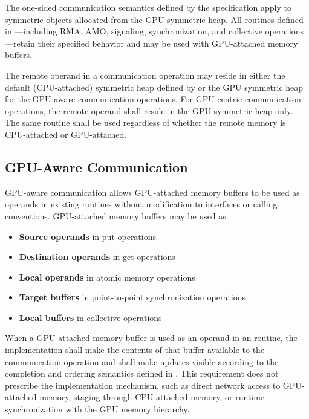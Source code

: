 
The one-sided communication semantics defined by the \openshmem specification
apply to symmetric objects allocated from the \ac{GPU} symmetric heap. All
routines defined in ---including \ac{RMA}, \ac{AMO}, signaling,
synchronization, and collective operations---retain their specified behavior and
may be used with GPU-attached memory buffers.

The remote operand in a communication operation may reside in either the default
(CPU-attached) symmetric heap defined by  or the \ac{GPU}
symmetric heap for the GPU-aware communication operations. For GPU-centric
communication operations, the remote operand shall reside in the \ac{GPU}
symmetric heap only. The same \openshmem routine shall be used regardless of whether
the remote memory is CPU-attached or GPU-attached.

\subsection{GPU-Aware Communication}\label{subsec:gpu_aware_comm}

GPU-aware communication allows GPU-attached memory buffers to be used as
operands in existing \openshmem routines without modification to interfaces or
calling conventions. GPU-attached memory buffers may be used as:

\begin{itemize}
\item \textbf{Source operands} in put operations
\item \textbf{Destination operands} in get operations
\item \textbf{Local operands} in atomic memory operations
\item \textbf{Target buffers} in point-to-point synchronization operations
\item \textbf{Local buffers} in collective operations
\end{itemize}

When a GPU-attached memory buffer is used as an operand in an \openshmem
routine, the \openshmem implementation shall make the contents of that buffer
available to the communication operation and shall make updates visible according
to the completion and ordering semantics defined in . This
requirement does not prescribe the implementation mechanism, such as direct
network access to GPU-attached memory, staging through CPU-attached memory, or
runtime synchronization with the \ac{GPU} memory hierarchy.

